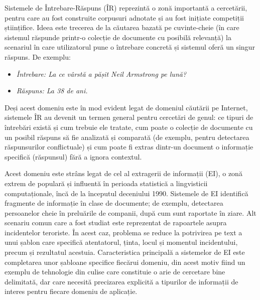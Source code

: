 \begin{multicols}{2}
Sistemele de Întrebare-Răspuns (ÎR) reprezintă o zonă importantă a cercetării, pentru care au fost construite corpusuri adnotate și au fost inițiate competiții științifice. Ideea este trecerea de la căutarea bazată pe cuvinte-cheie (în care sistemul răspunde \mbox{printr-o} colecție de documente cu posibilă relevanță) la scenariul în care utilizatorul pune o întrebare concretă și sistemul oferă un singur răspuns. De exemplu:

\begin{itemize}
\item[]\textit{Întrebare: La ce vârstă a pășit Neil Armstrong pe lună?}
\item[]\textit{Răspuns: La 38 de ani.}
\end{itemize}

Deși acest domeniu este în mod evident legat de domeniul căutării pe Internet, sistemele ÎR au devenit un termen general pentru cercetări de genul: ce tipuri de întrebări există și cum trebuie ele tratate, cum poate o colecție de documente cu un posibil răspuns să fie analizată și comparată (de exemplu, pentru detectarea răspunsurilor conflictuale) și cum poate fi extras \mbox{dintr-un} document o informație specifică (răspunsul) fără a ignora contextul. 


Acest domeniu este strâns legat de cel al extragerii de informații (EI), o zonă extrem de populară și influentă în perioada statistică a lingvisticii computaționale, încă de la începutul deceniului 1990. Sistemele de EI identifică fragmente de informație în clase de documente; de exemplu, detectarea persoanelor cheie în preluările de companii, după cum sunt raportate în ziare. Alt scenariu comun care a fost studiat este reprezentat de rapoartele asupra incidentelor teroriste. În acest caz, problema se reduce la potrivirea pe text a unui șablon care specifică atentatorul, ținta, locul și momentul incidentului, precum și rezultatul acestuia. Caracteristica principală a sistemelor de EI este completarea unor șabloane specifice fiecărui domeniu, din acest motiv fiind un exemplu de tehnologie din culise care constituie o arie de cercetare bine delimitată, dar care necesită precizarea explicită a tipurilor de informații de interes pentru fiecare domeniu de aplicație.


\end{multicols}
